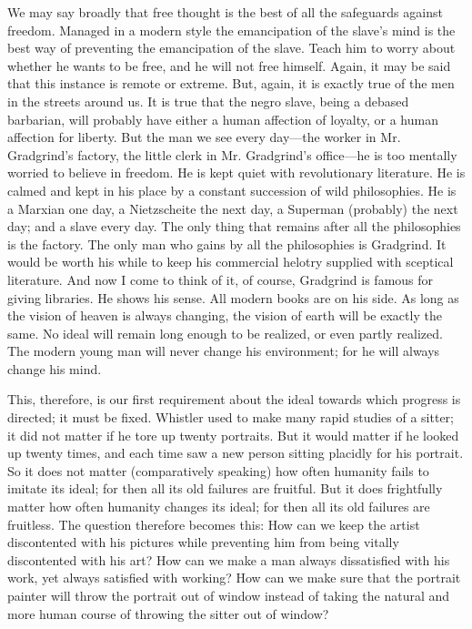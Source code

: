 We may say broadly that free thought is the best of all the safeguards against freedom. Managed in a modern style the emancipation of the slave’s mind is the best way of preventing the emancipation of the slave. Teach him to worry about whether he wants to be free, and he will not free himself. Again, it may be said that this instance is remote or extreme. But, again, it is exactly true of the men in the streets around us. It is true that the negro slave, being a debased barbarian, will probably have either a human affection of loyalty, or a human affection for liberty. But the man we see every day—the worker in Mr. Gradgrind’s factory, the little clerk in Mr. Gradgrind’s office—he is too mentally worried to believe in freedom. He is kept quiet with revolutionary literature. He is calmed and kept in his place by a constant succession of wild philosophies. He is a Marxian one day, a Nietzscheite the next day, a Superman (probably) the next day; and a slave every day. The only thing that remains after all the philosophies is the factory. The only man who gains by all the philosophies is Gradgrind. It would be worth his while to keep his commercial helotry supplied with sceptical literature. And now I come to think of it, of course, Gradgrind is famous for giving libraries. He shows his sense. All modern books are on his side. As long as the vision of heaven is always changing, the vision of earth will be exactly the same. No ideal will remain long enough to be realized, or even partly realized. The modern young man will never change his environment; for he will always change his mind.

This, therefore, is our first requirement about the ideal towards which progress is directed; it must be fixed. Whistler used to make many rapid studies of a sitter; it did not matter if he tore up twenty portraits. But it would matter if he looked up twenty times, and each time saw a new person sitting placidly for his portrait. So it does not matter (comparatively speaking) how often humanity fails to imitate its ideal; for then all its old failures are fruitful. But it does frightfully matter how often humanity changes its ideal; for then all its old failures are fruitless. The question therefore becomes this: How can we keep the artist discontented with his pictures while preventing him from being vitally discontented with his art? How can we make a man always dissatisfied with his work, yet always satisfied with working? How can we make sure that the portrait painter will throw the portrait out of window instead of taking the natural and more human course of throwing the sitter out of window?

